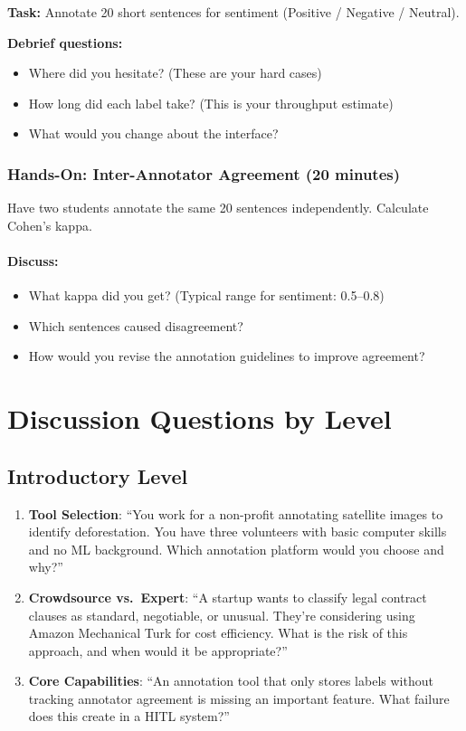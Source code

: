 \textbf{Task:} Annotate 20 short sentences for sentiment (Positive / Negative / Neutral).

\textbf{Debrief questions:}
\begin{itemize}
    \item Where did you hesitate? (These are your hard cases)
    \item How long did each label take? (This is your throughput estimate)
    \item What would you change about the interface?
\end{itemize}

\subsubsection{Hands-On: Inter-Annotator Agreement (20 minutes)}

Have two students annotate the same 20 sentences independently. Calculate Cohen's kappa.

\paragraph{Discuss:}
\begin{itemize}
    \item What kappa did you get? (Typical range for sentiment: 0.5--0.8)
    \item Which sentences caused disagreement?
    \item How would you revise the annotation guidelines to improve agreement?
\end{itemize}

\section{Discussion Questions by Level}

\subsection{Introductory Level}

\begin{enumerate}
    \item \textbf{Tool Selection}: ``You work for a non-profit annotating satellite images to identify deforestation. You have three volunteers with basic computer skills and no ML background. Which annotation platform would you choose and why?''

    \item \textbf{Crowdsource vs.\ Expert}: ``A startup wants to classify legal contract clauses as standard, negotiable, or unusual. They're considering using Amazon Mechanical Turk for cost efficiency. What is the risk of this approach, and when would it be appropriate?''

    \item \textbf{Core Capabilities}: ``An annotation tool that only stores labels without tracking annotator agreement is missing an important feature. What failure does this create in a HITL system?''
\end{enumerate}

